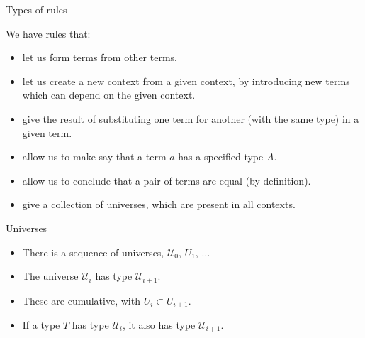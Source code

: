 \documentclass[10 pt., handout]{beamer}
\theoremstyle{plain}
\theoremstyle{remark}
\newcommand{\U}{\mathcal{U}}
\begin{document}
\begin{frame}{Types of rules}

We have rules that:

\begin{itemize}

\item let us form terms from other terms.

\item let us create a new context from a given context, by introducing new terms which can depend on the given context.

\item give the result of substituting one term for another (with the same type) in a given term.

\item allow us to make say that a term $a$ has a specified type $A$.

\item allow us to conclude that a pair of terms are equal (by definition).

\item give a collection of universes, which are present in all contexts.

\end{itemize}

\end{frame}



\begin{frame}{Universes}

\begin{itemize}

\item There is a sequence of universes, $\U_0$, $U_1$, $\dots$
    
\item The universe $\U_i$ has type $\U_{i+1}$. 

\item These are cumulative, with $U_i \subset U_{i+1}$.

\item If a type $T$ has type $\U_i$, it also has type $\U_{i+1}$.  


\end{itemize}

\end{frame}
\end{document}
